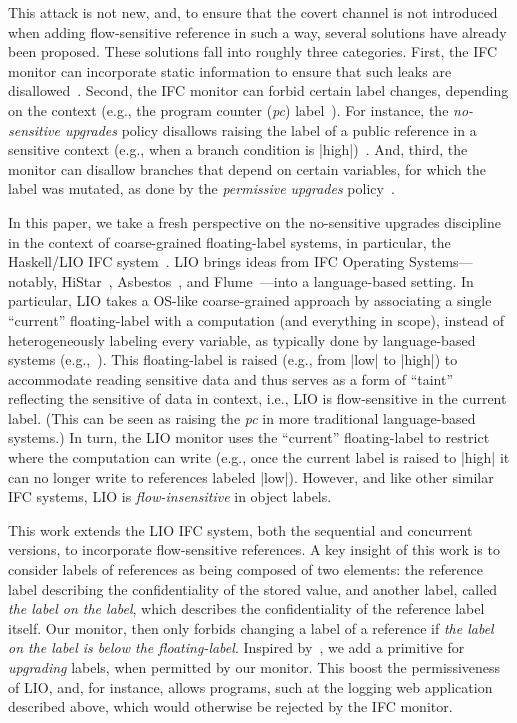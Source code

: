 This attack is not new, and, to ensure that the covert channel is
not introduced when adding flow-sensitive reference in such a way,
several solutions have already been proposed. 
%
These solutions fall into roughly three categories.
%
First, the IFC monitor can incorporate static information to ensure that such
leaks are disallowed~\cite{Russo:2010,stefan:lio,Breeze}.
%
Second, the IFC monitor can forbid certain label changes, depending on the
context (e.g., the program counter (\emph{pc})
label~\cite{sabelfeld:language-based-iflow}).
%
For instance, the \emph{no-sensitive upgrades} policy disallows raising the
label of a public reference in a sensitive context (e.g., when a branch
condition is |high|)~\cite{Zdancewic02programminglanguages,
Austin:Flanagan:PLAS09}.
%
And, third, the monitor can disallow branches that depend on certain variables,
for which the label was mutated, as done by the \emph{permissive upgrades}
policy~\cite{Austin:Flanagan:PLAS10}.

In this paper, we take a fresh perspective on the no-sensitive upgrades
discipline in the context of coarse-grained floating-label systems, in
particular, the Haskell/LIO IFC system~\cite{stefan:lio,
stefan:addressing-covert}. 
%
LIO brings ideas from IFC Operating Systems---notably,
HiStar~\cite{zeldovich:histar}, Asbestos~\cite{Efstathopoulos:2005}, and
Flume~\cite{krohn:flume}---into a language-based setting.
%
In particular, LIO takes a OS-like coarse-grained approach by associating a
single ``current'' floating-label with a computation (and everything in scope),
instead of heterogeneously labeling every variable, as typically done by
language-based systems (e.g.,~\cite{jif,FlowCaml}).
%
This floating-label is raised (e.g., from |low| to |high|) to accommodate
reading sensitive data and thus serves as a form of ``taint'' reflecting the
sensitive of data in context, i.e., LIO is flow-sensitive in the current label.
%
(This can be seen as raising the \emph{pc} in more traditional language-based
systems.)
%
In turn, the LIO monitor uses the ``current'' floating-label to
restrict where the computation can write (e.g., once the current label
is raised to |high| it can no longer write to references labeled
|low|).
%
However, and like other similar IFC systems, LIO is \emph{flow-insensitive} in
object labels.

This work extends the LIO IFC system, both the sequential and concurrent
versions, to incorporate flow-sensitive references.
%
A key insight of this work is to consider labels of references as
being composed of two elements: the reference label describing the
confidentiality of the stored value, and another label, called
\emph{the label on the label}, which describes the confidentiality of
the reference label itself.
%
Our monitor, then only forbids changing a label of a reference if
\emph{the label on the label is below the floating-label}.
%
Inspired by~\cite{Hedin13}, we add a primitive for \emph{upgrading} labels,
when permitted by our monitor.
%
This boost the permissiveness of LIO, and, for instance, allows programs, such
at the logging web application described above, which would otherwise be
rejected by the IFC monitor.

